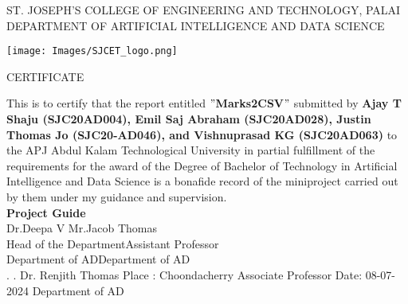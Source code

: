 \newpage
\thispagestyle{empty}
\begin{center}
\normalsize{ST. JOSEPH’S COLLEGE OF ENGINEERING AND TECHNOLOGY, PALAI}\\[0.5cm]
\normalsize
 { DEPARTMENT OF ARTIFICIAL INTELLIGENCE AND DATA SCIENCE}\\[1.0cm]%
   \begin{center}
   \texttt{[image: Images/SJCET\_logo.png]}
   \end{center}
{\large CERTIFICATE}\\[1.5cm]
\end{center}
\normalsize 
This is to certify that the report entitled {\bf $"$Marks2CSV$"$} submitted by { \bf Ajay T Shaju (SJC20AD004), Emil Saj Abraham (SJC20AD028), Justin Thomas Jo (SJC20-AD046), and Vishnuprasad KG (SJC20AD063)} to the APJ Abdul Kalam Technological University in partial fulfillment of the requirements for the award of the Degree of Bachelor of Technology in Artificial Intelligence and Data Science is a bonafide record of the miniproject carried out by them under my guidance and supervision.\vspace{1.3 cm}\\
{\bf Project Guide}\hspace{8.35 cm}{\bf Project Coordinator}\\
Dr.Deepa V\hspace{9.0 cm} Mr.Jacob Thomas\\
Head of the Department\hspace{6.85 cm}Assistant Professor\hspace{2.6 cm}\\Department of AD\hspace{7.9 cm}Department of AD
\vspace{1.3 cm}\\
.\hspace{11.06 cm}{\bf Head of the Department}
\newline
.\hspace{11.01 cm} Dr. Renjith Thomas
\newline
Place : Choondacherry  \hspace{6.87 cm} Associate Professor
\newline
Date\hspace{0.25 cm}: 08-07-2024 \hspace{7.7 cm} Department of AD
                

